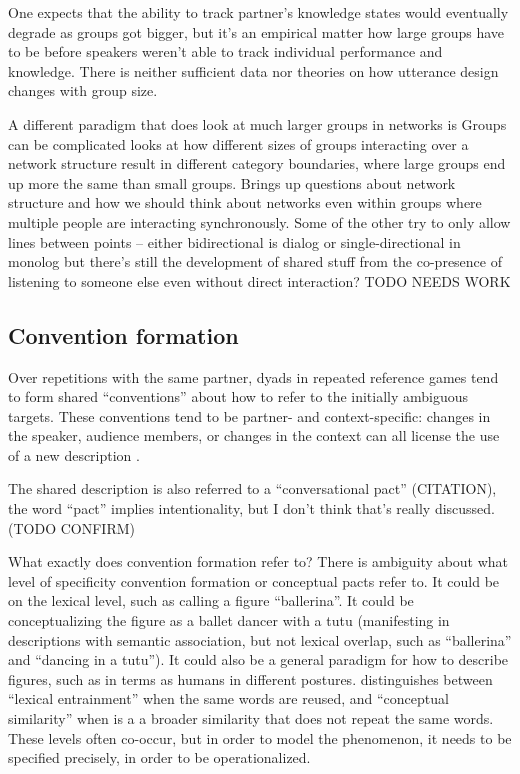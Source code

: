 \documentclass[]{article}
\begin{document}
One expects that the ability to track partner's knowledge states would eventually degrade as groups got bigger, but it's an empirical matter how large groups have to be before speakers weren't able to track individual performance and knowledge. There is neither sufficient data nor theories on how utterance design changes with group size. 

A different paradigm that does look at much larger groups in networks is 	Groups can be complicated \cite{guilbeault2021} looks at how different sizes of groups interacting over a network structure result in different category boundaries, where large groups end up more the same than small groups. Brings up questions about network structure and how we should think about networks even within groups where multiple people are interacting synchronously. Some of the other try to only allow lines between points -- either bidirectional is dialog or single-directional in monolog but there's still the development of shared stuff from the co-presence of listening to someone else even without direct interaction? TODO NEEDS WORK

\subsection{Convention formation}
Over repetitions with the same partner, dyads in repeated reference games tend to form shared ``conventions'' about how to refer to the initially ambiguous targets. These conventions tend to be partner- and context-specific: changes in the speaker, audience members, or changes in the context can all license the use of a new description \cite{metzing2003a, ibarra2016, yoon2014}.

The shared description is also referred to a ``conversational pact'' (CITATION), the word ``pact'' implies intentionality, but I don't think that's really discussed. (TODO CONFIRM)

What exactly does convention formation refer to? There is ambiguity about what level of specificity convention formation or conceptual pacts refer to. 
It could be on the lexical level, such as calling a figure ``ballerina''. It could be conceptualizing the figure as a ballet dancer with a tutu (manifesting in descriptions with semantic association, but not lexical overlap, such as ``ballerina'' and ``dancing in a tutu''). It could also be a general paradigm for how to describe figures, such as in terms as humans in different postures.  \cite{horton2002a} distinguishes between ``lexical entrainment'' when the same words are reused, and ``conceptual similarity'' when is a a broader similarity that does not repeat the same words. These levels often co-occur, but in order to model the phenomenon, it needs to be specified precisely, in order to be operationalized. 
\end{document}
